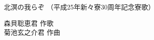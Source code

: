 \documentclass[10pt,b5j]{tarticle} %
\begin{document}
\begin{minipage}[c]{0.7\hsize} %
    \begin{center}
        {\LARGE
            北溟の我らぞ %
        }
        {\small 
            （平成25年新々寮30周年記念寮歌） %
        }
    \end{center}
\end{minipage}
\begin{minipage}[c]{0.3\hsize} %
    \begin{flushright} %
        森貝聡恵君 作歌\\菊池玄之介君 作曲 %
    \end{flushright}
\end{minipage}
\end{document}
